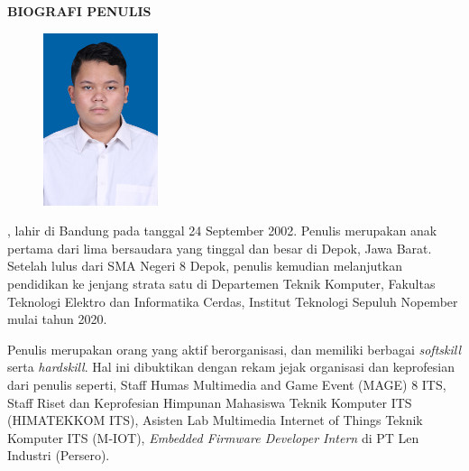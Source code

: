 \begin{center}
  \Large
  \textbf{BIOGRAFI PENULIS}
\end{center}


\vspace{2ex}

\begin{figure}
  \centering
  \vspace{-3ex}
  \includegraphics[width=0.3\textwidth]{gambar/evan.jpg}
  \vspace{-4ex}
\end{figure}

\name{}, lahir di Bandung pada tanggal 24 September 2002. Penulis merupakan anak pertama dari lima bersaudara yang tinggal dan besar di Depok, Jawa Barat. Setelah lulus dari SMA Negeri 8 Depok, penulis kemudian melanjutkan pendidikan ke jenjang strata satu di Departemen Teknik Komputer, Fakultas Teknologi Elektro dan Informatika Cerdas, Institut Teknologi Sepuluh Nopember mulai tahun 2020. 

Penulis merupakan orang yang aktif berorganisasi, dan memiliki berbagai \emph{softskill} serta \emph{hardskill}. Hal ini dibuktikan dengan rekam jejak organisasi dan keprofesian dari penulis seperti, Staff Humas Multimedia and Game Event (MAGE) 8 ITS, Staff Riset dan Keprofesian Himpunan Mahasiswa Teknik Komputer ITS (HIMATEKKOM ITS), Asisten Lab Multimedia Internet of Things Teknik Komputer ITS (M-IOT), \emph{Embedded Firmware Developer Intern} di PT Len Industri (Persero).